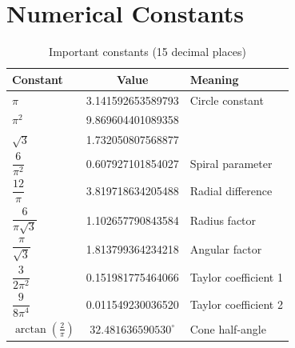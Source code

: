 \clearpage

\section{Numerical Constants}

\begin{table}[h]
\centering
\caption{Important constants (15 decimal places)}
\begin{tabular}{lcl}
\toprule
\textbf{Constant} & \textbf{Value} & \textbf{Meaning} \\
\midrule
$\pi$ & 3.141592653589793 & Circle constant \\
$\pi^2$ & 9.869604401089358 & \\
$\sqrt{3}$ & 1.732050807568877 & \\
$\dfrac{6}{\pi^2}$ & 0.607927101854027 & Spiral parameter \\
$\dfrac{12}{\pi}$ & 3.819718634205488 & Radial difference \\
$\dfrac{6}{\pi\sqrt{3}}$ & 1.102657790843584 & Radius factor \\
$\dfrac{\pi}{\sqrt{3}}$ & 1.813799364234218 & Angular factor \\
$\dfrac{3}{2\pi^2}$ & 0.151981775464066 & Taylor coefficient 1 \\
$\dfrac{9}{8\pi^4}$ & 0.011549230036520 & Taylor coefficient 2 \\
$\arctan(\frac{2}{\pi})$ & $32.481636590530^\circ$ & Cone half-angle \\
\bottomrule
\end{tabular}
\end{table}
